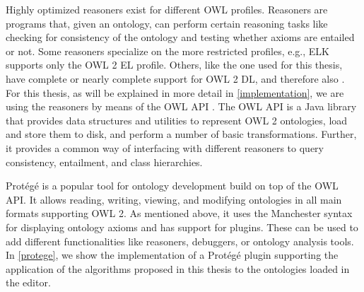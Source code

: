 Highly optimized reasoners exist for different OWL profiles. Reasoners are programs that, given an ontology, can perform certain reasoning tasks like checking for consistency of the ontology and testing whether axioms are entailed or not. Some reasoners specialize on the more restricted profiles, e.g., ELK \cite{kazakov2014elk} supports only the OWL 2 EL profile. Others, like the one used for this thesis, have complete or nearly complete support for OWL 2 DL, and therefore also \SROIQ. For this thesis, as will be explained in more detail in \cref{implementation}, we are using the reasoners by means of the OWL API \cite{horridge2011owl}. The OWL API is a Java library that provides data structures and utilities to represent OWL 2 ontologies, load and store them to disk, and perform a number of basic transformations. Further, it provides a common way of interfacing with different reasoners to query consistency, entailment, and class hierarchies.

Protégé \cite{musen2015protege} is a popular tool for ontology development build on top of the OWL API. It allows reading, writing, viewing, and modifying ontologies in all main formats supporting OWL 2. As mentioned above, it uses the Manchester syntax for displaying ontology axioms and has support for plugins. These can be used to add different functionalities like reasoners, debuggers, or ontology analysis tools. In \cref{protege}, we show the implementation of a Protégé plugin supporting the application of the algorithms proposed in this thesis to the ontologies loaded in the editor.

